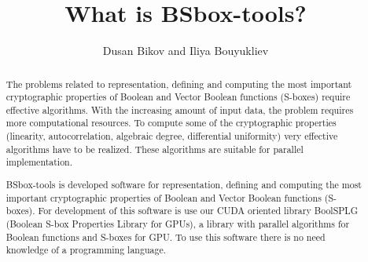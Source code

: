 \documentclass{article}
\begin{document}
\title{What is BSbox-tools?}
\author{Dusan Bikov and Iliya Bouyukliev}
\date{}
\maketitle


\begin{abstract}

The problems related to representation, defining and computing the most important cryptographic properties of Boolean and Vector Boolean functions (S-boxes) require effective algorithms. With the increasing a\-mount of input data, the problem requires more computational resources. To compute some of the cryptographic properties (linearity, autocorrelation, algebraic degree, differential uniformity) very effective algorithms have to be realized. These algorithms are suitable for parallel implementation.

BSbox-tools is developed software for representation, defining and computing the most important cryptographic properties of Boolean and Vector Boolean functions (S-boxes). For development of this software is use our CUDA oriented library BoolSPLG (Boolean S-box Properties Library for GPUs), a library with parallel algorithms for Boolean functions and S-boxes for GPU. To use this software there is no need knowledge of a programming language.

 \end{abstract}

\bigskip
\end{document}
